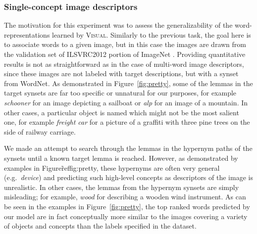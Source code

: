 \subsubsection{Single-concept image descriptors}
The motivation for this experiment was to assess
the generalizability of the word-representations learned by \textsc{Visual}.
Similarly to the previous task, the goal here is to associate words to a
given image, but in this case the images are drawn from the
validation set of ILSVRC2012 portion of ImageNet
\citep{russakovsky2015imagenet}. Providing quantitative results is not as
straightforward as in the case of multi-word image descriptors, since
these images are not labeled with target descriptions, but with a
synset from WordNet. As demonstrated in Figure~\ref{fig:pretty}, some of
the lemmas in the target synsets are far too specific or unnatural for our
purposes, for example {\it schooner} for an image
depicting a sailboat or {\it alp} for an image of a mountain.
In other cases, a particular object is named which
might not be the most salient one, for example {\it freight car} for a
picture of a graffiti with three pine trees on the side of railway carriage.

We made an attempt to search through the lemmas in the hypernym paths
of the synsets until a known target lemma is reached. However, as
demonstrated by examples in Figure\~ref{fig:pretty}, these hypernyms are
often very general (e.g.\ {\it device}) and predicting such high-level
concepts as descriptors of the image is unrealistic. In other cases,
the lemmas from the hypernym synsets are simply misleading; for
example, {\it wood} for describing a wooden wind instrument. As can be
seen in the examples in Figure~\ref{fig:pretty}, the top ranked words
predicted by our model are in fact conceptually more similar to the
images covering a variety of objects and concepts than the labels
specified in the dataset.




